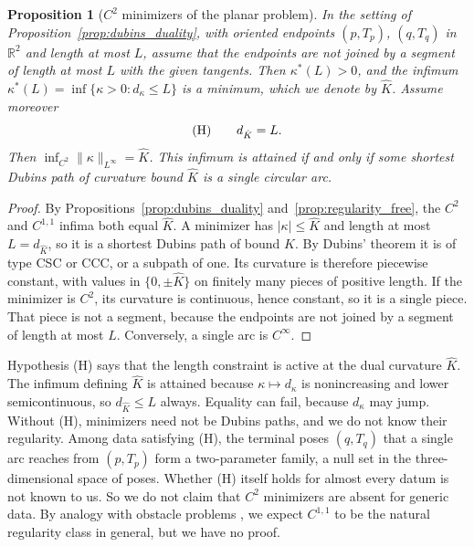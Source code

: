 \documentclass[11pt,reqno]{amsart}
\newtheorem{proposition}[theorem]{Proposition}
\theoremstyle{definition}
\providecommand{\R}{\mathbb{R}}
\numberwithin{equation}{section}
\providecommand{\R}{\mathbb{R}}
\begin{document}
\begin{proposition}[$C^2$ minimizers of the planar problem]
\label{prop:optimal_regularity}
In the setting of Proposition~\ref{prop:dubins_duality}, with oriented endpoints $(p, T_p)$, $(q, T_q)$ in $\R^2$ and length at most $L$, assume that the endpoints are not joined by a segment of length at most $L$ with the given tangents. Then $\kappa^*(L) > 0$, and the infimum $\kappa^*(L) = \inf\{\kappa > 0 : d_\kappa \le L\}$ is a minimum, which we denote by $\hat K$. Assume moreover
\begin{equation}
\label{eq:hypothesis_H}
\textup{(H)} \qquad d_{\hat K} = L .
\end{equation}
Then $\inf_{C^2} \|\kappa\|_{L^\infty} = \hat K$. This infimum is attained if and only if some shortest Dubins path of curvature bound $\hat K$ is a single circular arc.
\end{proposition}

\begin{proof}
By Propositions~\ref{prop:dubins_duality} and~\ref{prop:regularity_free}, the $C^2$ and $C^{1,1}$ infima both equal $\hat K$. A minimizer has $|\kappa| \le \hat K$ and length at most $L = d_{\hat K}$, so it is a shortest Dubins path of bound $\hat K$. By Dubins' theorem \cite{dubins1957} it is of type CSC or CCC, or a subpath of one. Its curvature is therefore piecewise constant, with values in $\{0, \pm\hat K\}$ on finitely many pieces of positive length. If the minimizer is $C^2$, its curvature is continuous, hence constant, so it is a single piece. That piece is not a segment, because the endpoints are not joined by a segment of length at most $L$. Conversely, a single arc is $C^\infty$.
\end{proof}

Hypothesis (H) says that the length constraint is active at the dual curvature $\hat K$. The infimum defining $\hat K$ is attained because $\kappa \mapsto d_\kappa$ is nonincreasing and lower semicontinuous, so $d_{\hat K} \le L$ always. Equality can fail, because $d_\kappa$ may jump. Without (H), minimizers need not be Dubins paths, and we do not know their regularity. Among data satisfying (H), the terminal poses $(q, T_q)$ that a single arc reaches from $(p, T_p)$ form a two-parameter family, a null set in the three-dimensional space of poses. Whether (H) itself holds for almost every datum is not known to us. So we do not claim that $C^2$ minimizers are absent for generic data. By analogy with obstacle problems \cite{caffarelli1998}, we expect $C^{1,1}$ to be the natural regularity class in general, but we have no proof.
\end{document}
